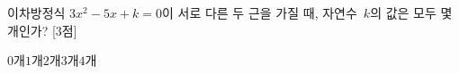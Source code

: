 이차방정식 $3x^2-5x+k=0$이 서로 다른 두 근을 가질 때, 자연수~$k$의 값은 모두 몇 개인가? \mbox{[3점]}
\begin{choices32}{$0$개}{$1$개}{$2$개}{$3$개}{$4$개}\end{choices32}
